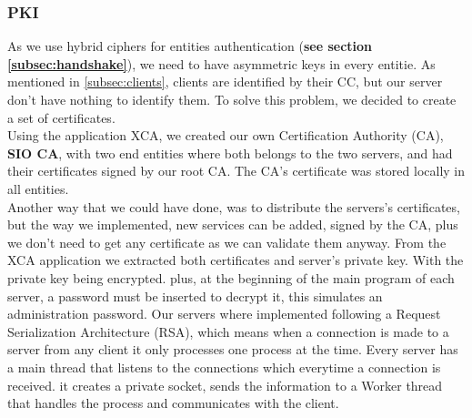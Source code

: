 \documentclass[12pt]{article}
\begin{document}
\subsubsection{PKI}
As we use hybrid ciphers for entities authentication (\textbf{see section \ref{subsec:handshake}}),
  we need to have asymmetric keys in every entitie. As mentioned in \ref{subsec:clients}, clients are
  identified by their CC, but our server don't have nothing to identify them. To solve this problem, we decided to 
  create a set of certificates. \\
Using the application XCA, we created our own Certification Authority (CA), \textbf{SIO CA}, with two
  end entities where both belongs to the two servers, and had their certificates signed
  by our root CA. The CA's certificate was stored locally in all entities. \\
Another way that we could have done, was to distribute the servers's certificates, but the
  way we implemented, new services can be added, signed by the CA, plus we don't need to
  get any certificate as we can validate them anyway.
From the XCA application we extracted both certificates and server's private key.
  With the private key being encrypted. plus, at the beginning of the main program of each server, a password
  must be inserted to decrypt it, this simulates an administration password.
Our servers where implemented following a Request Serialization Architecture (RSA), which means
  when a connection is made to a server from any client it only processes one process at the time. 
  Every server has a main thread that listens to the connections which everytime a connection is received. it
  creates a private socket, sends the information to a Worker thread that handles the process and
  communicates with the client.
\end{document}
